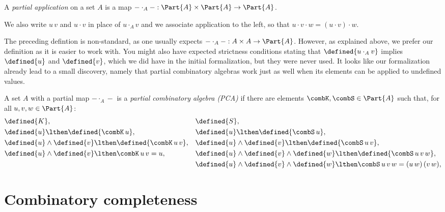 \begin{definition}
  \label{def:partial-application}
  \leanok
  A \emph{partial application} on a set $A$ is a map ${-} \cdot_A {-} : \Part{A} \times \Part{A} \to \Part{A}$.
\end{definition}

We also write $u \, v$ and $u \cdot v$ in place of $u \cdot_A v$ and we associate application to the left, so that $u \cdot v \cdot w = (u \cdot v) \cdot w$.

The preceding defintion is non-standard, as one usually expects ${-} \cdot_A {-} : A \times A \to \Part{A}$.
However, as explained above, we prefer our definition as it is easier to work with. You might also have expected
strictness conditions stating that $\defined{u \cdot_A v}$ implies $\defined{u}$ and $\defined{v}$, which we did have in the initial formalization, but they were never used. It looks like our formalization already lead to a small discovery, namely that partial combinatory algebras work just as well when its elements can be applied to undefined values.

\begin{definition}
  \label{def:PCA}
  \leanok
  A set $A$ with a partial map ${-} \cdot_A {-}$ is a \emph{partial combinatory algebra (PCA)} if there are
  elements $\combK, \combS \in \Part{A}$ such that, for all $u, v, w \in \Part{A}$:
  \begin{align*}
    &\defined{K}, &
    &\defined{S},\\
    &\defined{u} \lthen \defined{\combK \, u}, &
    &\defined{u} \lthen \defined{\combS \, u}, \\
    &\defined{u} \land \defined{v} \lthen \defined{\combK \, u \, v}, &
    &\defined{u} \land \defined{v} \lthen \defined{\combS \, u \, v}, \\
    &\defined{u} \land \defined{v} \lthen \combK \, u \, v = u, &
    &\defined{u} \land \defined{v} \land \defined{w} \lthen \defined{\combS \, u \, v \, w}, \\
    &&
    &\defined{u} \land \defined{v} \land \defined{w}
     \lthen \combS \, u \, v \, w = (u \, w) \, (v \, w), \\
  \end{align*}
\end{definition}


\section{Combinatory completeness}


